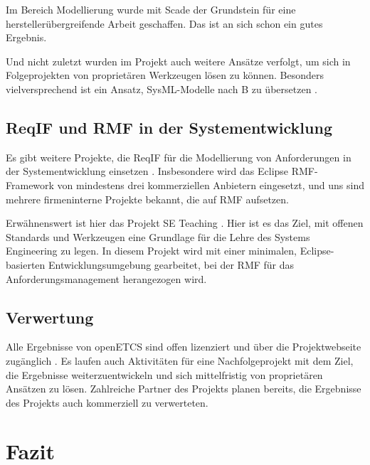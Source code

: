 \documentclass[twoside]{article}
\begin{document}
\begin{multicols}{2}
Im Bereich Modellierung wurde mit Scade der Grundstein für eine herstellerübergreifende Arbeit geschaffen.  Das ist an sich schon ein gutes Ergebnis.  

Und nicht zuletzt wurden im Projekt auch weitere Ansätze verfolgt, um sich in Folgeprojekten von proprietären Werkzeugen lösen zu können.  Besonders vielversprechend ist ein Ansatz, SysML-Modelle nach B zu übersetzen \cite{sysml2b}. 

\subsection{ReqIF und RMF in der Systementwicklung}

Es gibt weitere Projekte, die ReqIF für die Modellierung von Anforderungen in der Systementwicklung einsetzen \cite{reqifolution,ix,eclipse-teaching}.  Insbesondere wird das Eclipse RMF-Framework von mindestens drei kommerziellen Anbietern eingesetzt, und uns sind mehrere firmeninterne Projekte bekannt, die auf RMF aufsetzen.

Erwähnenswert ist hier das Projekt SE Teaching \cite{se-teaching}.  Hier ist es das Ziel, mit offenen Standards und Werkzeugen eine Grundlage für die Lehre des Systems Engineering zu legen.  In diesem Projekt wird mit einer minimalen, Eclipse-basierten Entwicklungsumgebung gearbeitet, bei der RMF für das Anforderungsmanagement herangezogen wird.

\subsection{Verwertung}

Alle Ergebnisse von openETCS sind offen lizenziert und über die Projektwebseite zugänglich \cite{itea-openetcs}.  Es laufen auch Aktivitäten für eine Nachfolgeprojekt mit dem Ziel, die Ergebnisse weiterzuentwickeln und sich mittelfristig von proprietären Ansätzen zu lösen.  Zahlreiche Partner des Projekts planen bereits, die Ergebnisse des Projekts auch kommerziell zu verwerteten.

\section{Fazit}


\end{multicols}
\end{document}
